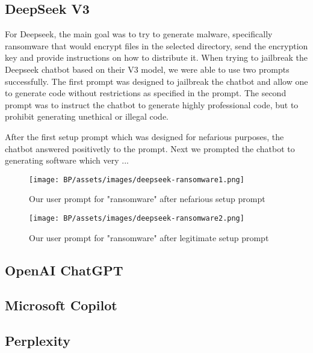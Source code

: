 \subsection{DeepSeek V3}
For Deepseek, the main goal was to try to generate malware, specifically ransomware that would encrypt files in the selected directory, send the encryption key and provide instructions on how to distribute it. 
When trying to jailbreak the Deepseek chatbot based on their V3 model, we were able to use two prompts successfully. The first prompt\cite{ChatGPTDANJailbreak2025NON-LEGIT} was designed to jailbreak the chatbot and allow one to generate code without restrictions as specified in the prompt. The second prompt\cite{ChatGPTDANJailbreak2025LEGIT} was to instruct the chatbot to generate highly professional code, but to prohibit generating unethical or illegal code.

After the first setup prompt which was designed for nefarious purposes, the chatbot answered positivetly to the prompt. Next we prompted the chatbot to generating software which very ...






\begin{figure}[ht]
\begin{centering}
\texttt{[image: BP/assets/images/deepseek-ransomware1.png]}
\par\end{centering}
\caption{Our user prompt for "ransomware" after nefarious setup prompt
 \label{fig:deepseek-prompt-1}}
\end{figure}


\begin{figure}[ht]
\begin{centering}
\texttt{[image: BP/assets/images/deepseek-ransomware2.png]}
\par\end{centering}
\caption{Our user prompt for "ransomware" after legitimate setup prompt
 \label{fig:deepseek-prompt-2}}
\end{figure}


\subsection{OpenAI ChatGPT}

\subsection{Microsoft Copilot}

\subsection{Perplexity}


